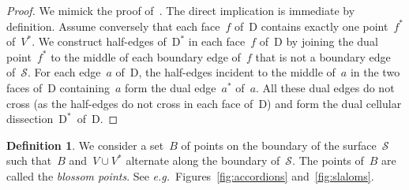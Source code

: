 \documentclass{amsart}
\theoremstyle{definition}
\newtheorem{definition}[theorem]{Definition}
\newtheorem{remark}[theorem]{Remark}
\newcommand{\eg}{\textit{e.g.}~} %
\newcommand{\darkblue}{\color{darkblue}} %
\newcommand{\defn}[1]{\textsl{\darkblue #1}} %
\newcommand{\surface}{\mathcal{S}} %
\newcommand{\dual}{^*} %
\newcommand{\dissection}{\mathrm{D}} %
\begin{document}
\begin{proof}
We mimick the proof of~\cite[Prop.~1.12]{OpperPlamondonSchroll}.
The direct implication is immediate by definition.
Assume conversely that each face~$f$ of~$\dissection$ contains exactly one point~$f\dual$ of~$V\dual$.
We construct half-edges of~$\dissection\dual$ in each face~$f$ of~$\dissection$ by joining the dual point~$f\dual$ to the middle of each boundary edge of~$f$ that is not a boundary edge of~$\surface$.
For each edge~$a$ of~$\dissection$, the half-edges incident to the middle of~$a$ in the two faces of~$\dissection$ containing~$a$ form the dual edge~$a\dual$ of~$a$.
All these dual edges do not cross (as the half-edges do not cross in each face of~$\dissection$) and form the dual cellular dissection~$\dissection\dual$~of~$\dissection$.
\end{proof}


\begin{definition}
We consider a set~$B$ of points on the boundary of the surface~$\surface$ such that~$B$ and~$V \cup V\dual$ alternate along the boundary of~$\surface$.
The points of~$B$ are called the \defn{blossom points}.
See \eg Figures~\ref{fig:accordions} and~\ref{fig:slaloms}.
\end{definition}
\end{document}
